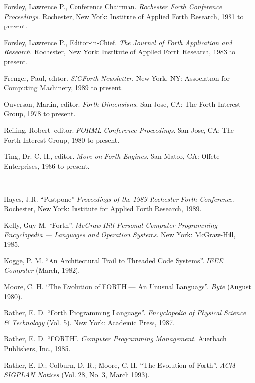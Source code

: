 \begin{description}
	\begin{description}
	\item Forsley, Lawrence P., Conference Chairman.
		\emph{Rochester Forth Conference Proceedings}.
		Rochester, New York: Institute of Applied Forth Research, 1981 to present.

	\item Forsley, Lawrence P., Editor-in-Chief.
		\emph{The Journal of Forth Application and Research}.
		Rochester, New York: Institute of Applied Forth Research, 1983 to present.

	\item Frenger, Paul, editor.
		\emph{SIGForth Newsletter}.
		New York, NY: Association for Computing Machinery, 1989 to present.

	\item Ouverson, Marlin, editor.
		\emph{Forth Dimensions}.
		San Jose, CA: The Forth Interest Group, 1978 to present.

	\item Reiling, Robert, editor.
		\emph{FORML Conference Proceedings}.
		San Jose, CA: The Forth Interest Group, 1980 to present.

	\item Ting, Dr. C. H., editor.
		\emph{More on Forth Engines}.
		San Mateo, CA: Offete Enterprises, 1986 to present.
	\end{description}


\item[Selected articles]~

	\begin{description}
	\item Hayes, J.R.
		``Postpone''
		\emph{Proceedings of the 1989 Rochester Forth Conference}.
		Rochester, New York: Institute for Applied Forth Research, 1989.

	\item Kelly, Guy M.
		``Forth''.
		\emph{McGraw-Hill Personal Computer Programming Encyclopedia
		--- Lan\-guages and Operation Systems}.
		New York: McGraw-Hill, 1985.

	\item Kogge, P. M.
		``An Architectural Trail to Threaded Code Systems''.
		\emph{IEEE Computer} (March, 1982).

	\item Moore, C. H.
		``The Evolution of FORTH --- An Unusual Language''.
		\emph{Byte} (August 1980).

	\item Rather, E. D.
		``Forth Programming Language''.
		\emph{Encyclopedia of Physical Science \& Technology} (Vol. 5).
		New York: Academic Press, 1987.

	\item Rather, E. D.
		``FORTH''.
		\emph{Computer Programming Management}.
		Auerbach Publishers, Inc., 1985.

	\item Rather, E. D.; Colburn, D. R.; Moore, C. H.
		``The Evolution of Forth''.
		\emph{ACM SIGPLAN Notices} (Vol. 28, No. 3, March 1993).
	\end{description}

\end{description}
